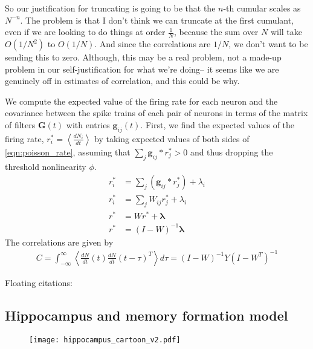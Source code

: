 \documentclass [12pt]{amsart}
\newcommand\abk[1]{\left\langle #1 \right\rangle}
\theoremstyle{definition}
\newcommand{\inv}{^{-1}}
\begin{document}
So our justification for truncating is going to be that the $n$-th cumular scales as $N^{-n}$. The problem is that I don't think we can truncate at the first cumulant, even if we are looking to do things at order $\frac 1 N$, because the sum over $N$ will take $O(1/N^2)$ to $O(1/N)$. And since the correlations are $1/N$, we don't want to be sending this to zero. Although, this may be a real problem, not a made-up problem in our self-justification for what we're doing-- it seems like we are genuinely off in estimates of correlation, and this could be why. 



We compute the expected value of the firing rate for each neuron and the covariance between the spike trains of each pair of neurons in terms of the matrix of filters $\mathbf G(t)$ with entries $\mathbf g_{ij}(t)$. 
First, we find the expected values of the firing rate, $r_i^* = \abk{\frac{d N_i}{dt} }$ by taking expected values of both sides of \ref{eqn:poisson_rate}, assuming that $\sum_j \mathbf g_{ij} * r^*_j > 0$ and thus dropping the threshold nonlinearity $\phi$. 
\begin{align*}
r_i^* &= \sum_j \left(\mathbf g_{ij} * r^*_j\right) + \lambda_i\\
r_i^* &= \sum_j W_{ij} r^*_j + \lambda_i\\
r^* &= W r^* + \mathbf \lambda \\
r^*  &= (I - W)\inv \mathbf \lambda
\end{align*}
The correlations are given by 
\begin{align*}
C = \int_{-\infty}^\infty \abk{\frac{dN}{dt}(t) \frac{dN}{dt}(t-\tau)^T}d\tau =  (I - W)\inv Y(I - W^T)\inv
\end{align*}


Floating citations: 
\cite{mendez2018homeostatic}

\subsection{Hippocampus and memory formation model}


\begin{figure}
\texttt{[image: hippocampus\_cartoon\_v2.pdf]}
\caption{\label{fig:hippocampus}}
\end{figure}
\end{document}
